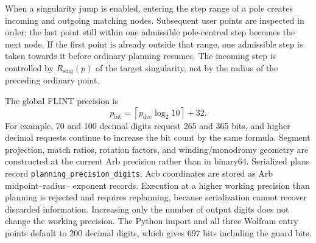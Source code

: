 \documentclass[11pt]{article}
\begin{document}
When a singularity jump is enabled, entering the step range of a pole creates incoming and outgoing
matching nodes.  Subsequent user points are inspected in order; the last point still within
one admissible pole-centred step becomes the next node.  If the first point is already
outside that range, one admissible step is taken towards it before ordinary planning resumes.
The incoming step is controlled by $R_{\mathrm{sing}}(p)$ of the target singularity, not by
the radius of the preceding ordinary point.

The global FLINT precision is
\begin{equation}
 p_{\mathrm{bit}}=\left\lceil p_{\mathrm{dec}}\log_2 10\right\rceil+32.
\end{equation}
For example, 70 and 100 decimal digits request 265 and 365 bits, and higher decimal requests
continue to increase the bit count by the same formula.  Segment projection, match ratios,
rotation factors, and winding/monodromy geometry are constructed at the current Arb
precision rather than in binary64.  Serialized plans record
\texttt{planning\_precision\_digits}; Acb coordinates are stored as Arb midpoint--radius--
exponent records.  Execution at a higher working precision than planning is rejected and
requires replanning, because serialization cannot recover discarded information.  Increasing
only the number of output digits does not change the working precision.
The Python import and all three Wolfram entry points default to 200 decimal digits, which gives
697 bits including the guard bits.
\end{document}
